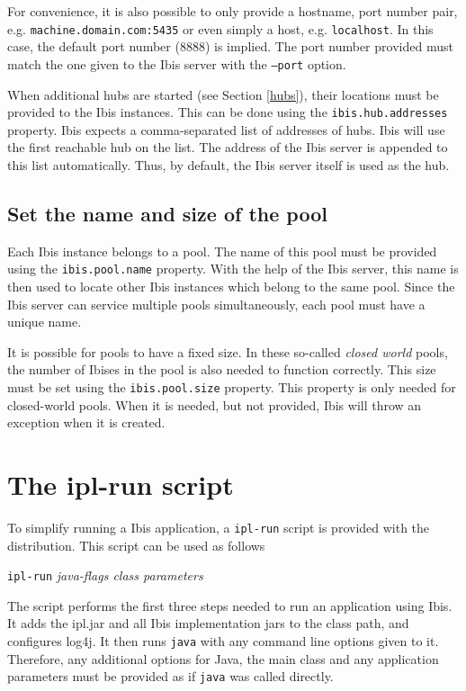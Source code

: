\documentclass[a4paper,10pt]{article}
\begin{document}
For convenience, it is also possible to only provide a hostname, port number 
pair, e.g. \texttt{machine.domain.com:5435} or even simply a host, e.g. 
\texttt{localhost}. In this case, the default port number (8888) is implied. 
The port number provided must match the one given to the Ibis server
with the \texttt{--port} option.

When additional hubs are started (see Section \ref{hubs}), their locations 
must be provided to the Ibis instances. This can be done using 
the \texttt{ibis.hub.addresses} property. Ibis expects a comma-separated
list of addresses of hubs. Ibis will use the first reachable hub on the
list. The address of the Ibis server is appended to this list
automatically. Thus, by default, the Ibis server itself is used as the
hub.

\subsection{Set the name and size of the pool}

Each Ibis instance belongs to a pool. The name of this pool must be provided 
using the \texttt{ibis.pool.name} property. With the help of the Ibis server, 
this name is then used to locate other Ibis instances which belong to the
same pool. Since the Ibis server can service multiple pools simultaneously, 
each pool must have a unique name.

It is possible for pools to have a fixed size. In these so-called \emph{closed
world} pools, the number of Ibises in the pool is also needed to function 
correctly. This size must be set using the \texttt{ibis.pool.size} property. 
This property is only needed for closed-world pools.
When it is needed, but not provided, Ibis will throw an exception when it
is created.

\section{The ipl-run script}

To simplify running a Ibis application, a \texttt{ipl-run} script is
provided with the distribution. This script can be
used as follows

\begin{center}
\texttt{ipl-run} \emph{java-flags class parameters}
\end{center}

The script performs the first three steps needed to run an application
using Ibis. It adds the ipl.jar and all Ibis implementation jars to the
class path, and configures log4j. It then runs \texttt{java} with any
command line options given to it. Therefore, any additional options for 
Java, the main class and any application parameters must be provided as 
if \texttt{java} was called directly.
\end{document}
